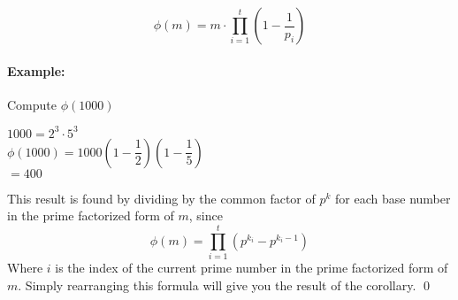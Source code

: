 \documentclass[../main.tex]{subfiles}
\begin{document}
\begin{cor}
    $$\phi(m)=m \cdot \prod_{i=1}^{t}(1-\dfrac{1}{p_i})$$
\end{cor}
\paragraph{Example:}
Compute $\phi(1000)$
\begin{center}
    $1000=2^3 \cdot 5^3$ \\
    $\phi(1000) = 1000(1 - \dfrac{1}{2})(1 - \dfrac{1}{5})$ \\
    $=400$
\end{center}
\begin{pf}[Corollary]
    This result is found by dividing by the common factor of $p^k$ for each base number in the prime factorized form of $m$, since
    $$\phi(m)=\prod_{i=1}^{t}(p^{k_i}-p^{k_i-1})$$
    Where $i$ is the index of the current prime number in the prime factorized form of $m$. Simply rearranging this formula will give you the result of the corollary. \qed
\end{pf}
\end{document}
